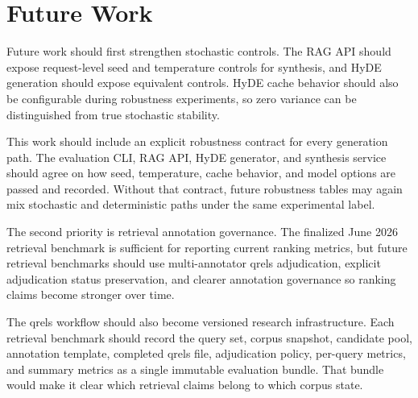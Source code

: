 \section{Future Work}

Future work should first strengthen stochastic controls. The RAG API should expose request-level seed and temperature controls for synthesis, and HyDE generation should expose equivalent controls. HyDE cache behavior should also be configurable during robustness experiments, so zero variance can be distinguished from true stochastic stability.

This work should include an explicit robustness contract for every generation path. The evaluation CLI, RAG API, HyDE generator, and synthesis service should agree on how seed, temperature, cache behavior, and model options are passed and recorded. Without that contract, future robustness tables may again mix stochastic and deterministic paths under the same experimental label.

The second priority is retrieval annotation governance. The finalized June 2026 retrieval benchmark is sufficient for reporting current ranking metrics, but future retrieval benchmarks should use multi-annotator qrels adjudication, explicit adjudication status preservation, and clearer annotation governance so ranking claims become stronger over time.

The qrels workflow should also become versioned research infrastructure. Each retrieval benchmark should record the query set, corpus snapshot, candidate pool, annotation template, completed qrels file, adjudication policy, per-query metrics, and summary metrics as a single immutable evaluation bundle. That bundle would make it clear which retrieval claims belong to which corpus state.

